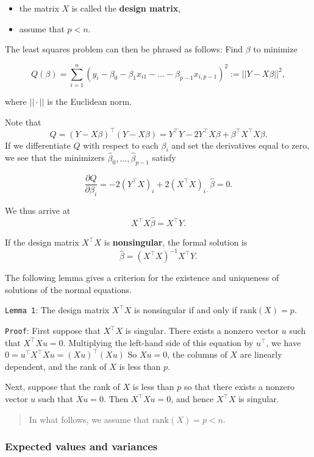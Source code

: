 \documentclass[]{article}
\begin{document}
\begin{itemize}
\item
  the matrix \(X\) is called the \textbf{design matrix},
\item
  assume that \(p<n\).
\end{itemize}

The least squares problem can then be phrased as follows: Find \(\beta\)
to minimize

\[Q(\beta)=\sum_{i=1}^n(y_i-\beta_0-\beta_1x_{i1}-\dots-\beta_{p-1}x_{i,p-1})^2:=||Y-X\beta||^2,\]

where \(||\cdot||\) is the Euclidean norm.

Note that
\[Q=(Y-X\beta)^\top(Y-X\beta) = Y^\top Y-2Y^\top X\beta+\beta^\top X^\top X\beta.\]
If we differentiate \(Q\) with respect to each \(\beta_i\) and set the
derivatives equal to zero, we see that the minimizers
\(\hat\beta_0,\dots,\hat\beta_{p-1}\) satisfy

\[\frac{\partial Q}{\partial \beta_i}=-2(Y^\top X)_i+2(X^{\top}X)_{i\cdot}\hat\beta=0.\]

We thus arrive at \[X^\top X\hat\beta = X^\top Y.\]

If the design matrix \(X^\top X\) is \textbf{nonsingular}, the formal
solution is \[\hat\beta = (X^\top X)^{-1}X^\top Y.\]

The following lemma gives a criterion for the existence and uniqueness
of solutions of the normal equations.

\texttt{Lemma\ 1}: The design matrix \(X^\top X\) is nonsingular if and
only if \(\mathrm{rank}(X)=p\).

\texttt{Proof}: First suppose that \(X^\top X\) is singular. There
exists a nonzero vector \(u\) such that \(X^\top Xu = 0\). Multiplying
the left-hand side of this equation by \(u^\top\), we have
\(0=u^\top X^\top Xu=(Xu)^\top (Xu)\) So \(Xu=0\), the columns of \(X\)
are linearly dependent, and the rank of \(X\) is less than \(p\).

Next, suppose that the rank of \(X\) is less than \(p\) so that there
exists a nonzero vector \(u\) such that \(Xu = 0\). Then
\(X^\top Xu = 0\), and hence \(X^\top X\) is singular.

\begin{quote}
In what follows, we assume that \(\mathrm{rank}(X)=p<n\).
\end{quote}

\hypertarget{expected-values-and-variances}{%
\subsubsection{Expected values and
variances}\label{expected-values-and-variances}}
\end{document}
